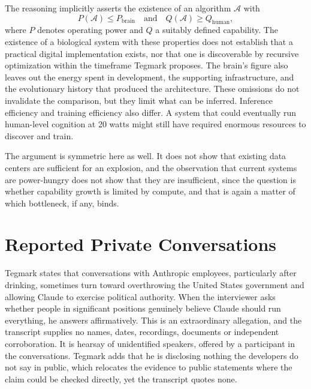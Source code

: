 \documentclass[11pt]{article}
\begin{document}
The reasoning implicitly asserts the existence of an algorithm $\mathcal{A}$ with
\[
P(\mathcal{A}) \le P_{\mathrm{brain}} \quad\text{and}\quad Q(\mathcal{A}) \ge Q_{\mathrm{human}},
\]
where $P$ denotes operating power and $Q$ a suitably defined capability. The existence of a biological system with these properties does not establish that a practical digital implementation exists, nor that one is discoverable by recursive optimization within the timeframe Tegmark proposes. The brain's figure also leaves out the energy spent in development, the supporting infrastructure, and the evolutionary history that produced the architecture. These omissions do not invalidate the comparison, but they limit what can be inferred. Inference efficiency and training efficiency also differ. A system that could eventually run human-level cognition at 20 watts might still have required enormous resources to discover and train.

The argument is symmetric here as well. It does not show that existing data centers are sufficient for an explosion, and the observation that current systems are power-hungry does not show that they are insufficient, since the question is whether capability growth is limited by compute, and that is again a matter of which bottleneck, if any, binds.

\section{Reported Private Conversations}\label{sec:private}

Tegmark states that conversations with Anthropic employees, particularly after drinking, sometimes turn toward overthrowing the United States government and allowing Claude to exercise political authority. When the interviewer asks whether people in significant positions genuinely believe Claude should run everything, he answers affirmatively. This is an extraordinary allegation, and the transcript supplies no names, dates, recordings, documents or independent corroboration. It is hearsay of unidentified speakers, offered by a participant in the conversations. Tegmark adds that he is disclosing nothing the developers do not say in public, which relocates the evidence to public statements where the claim could be checked directly, yet the transcript quotes none.
\end{document}
